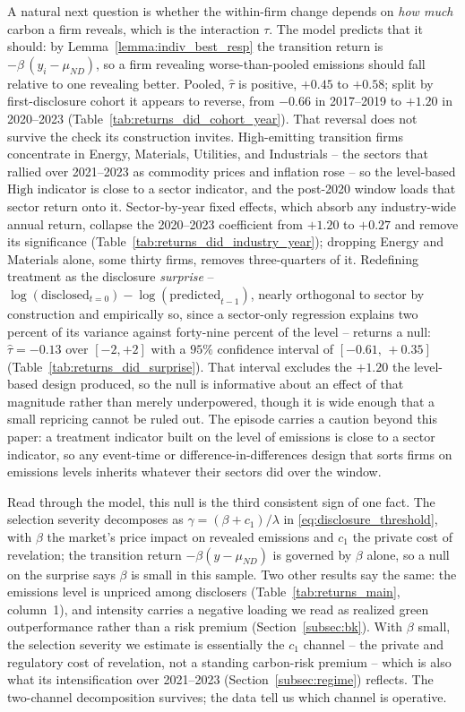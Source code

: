 \documentclass[a4paper,12pt]{article}
\begin{document}
A natural next question is whether the within-firm change depends on \emph{how much} carbon a firm reveals, which is the interaction $\tau$. The model predicts that it should: by Lemma~\ref{lemma:indiv_best_resp} the transition return is $-\beta\,(y_i - \mu_{ND})$, so a firm revealing worse-than-pooled emissions should fall relative to one revealing better. Pooled, $\hat\tau$ is positive, $+0.45$ to $+0.58$; split by first-disclosure cohort it appears to reverse, from $-0.66$ in 2017--2019 to $+1.20$ in 2020--2023 (Table~\ref{tab:returns_did_cohort_year}). That reversal does not survive the check its construction invites. High-emitting transition firms concentrate in Energy, Materials, Utilities, and Industrials -- the sectors that rallied over 2021--2023 as commodity prices and inflation rose -- so the level-based $\mathrm{High}$ indicator is close to a sector indicator, and the post-2020 window loads that sector return onto it. Sector-by-year fixed effects, which absorb any industry-wide annual return, collapse the 2020--2023 coefficient from $+1.20$ to $+0.27$ and remove its significance (Table~\ref{tab:returns_did_industry_year}); dropping Energy and Materials alone, some thirty firms, removes three-quarters of it. Redefining treatment as the disclosure \emph{surprise} -- $\log(\text{disclosed}_{t=0}) - \log(\text{predicted}_{t-1})$, nearly orthogonal to sector by construction and empirically so, since a sector-only regression explains two percent of its variance against forty-nine percent of the level -- returns a null: $\hat\tau = -0.13$ over $[-2,+2]$ with a $95\%$ confidence interval of $[-0.61,\,+0.35]$ (Table~\ref{tab:returns_did_surprise}). That interval excludes the $+1.20$ the level-based design produced, so the null is informative about an effect of that magnitude rather than merely underpowered, though it is wide enough that a small repricing cannot be ruled out. The episode carries a caution beyond this paper: a treatment indicator built on the level of emissions is close to a sector indicator, so any event-time or difference-in-differences design that sorts firms on emissions levels inherits whatever their sectors did over the window.

Read through the model, this null is the third consistent sign of one fact. The selection severity decomposes as $\gamma = (\beta + c_1)/\lambda$ in \eqref{eq:disclosure_threshold}, with $\beta$ the market's price impact on revealed emissions and $c_1$ the private cost of revelation; the transition return $-\beta(y - \mu_{ND})$ is governed by $\beta$ alone, so a null on the surprise says $\beta$ is small in this sample. Two other results say the same: the emissions level is unpriced among disclosers (Table~\ref{tab:returns_main}, column~1), and intensity carries a negative loading we read as realized green outperformance rather than a risk premium (Section~\ref{subsec:bk}). With $\beta$ small, the selection severity we estimate is essentially the $c_1$ channel -- the private and regulatory cost of revelation, not a standing carbon-risk premium -- which is also what its intensification over 2021--2023 (Section~\ref{subsec:regime}) reflects. The two-channel decomposition survives; the data tell us which channel is operative.
\end{document}
